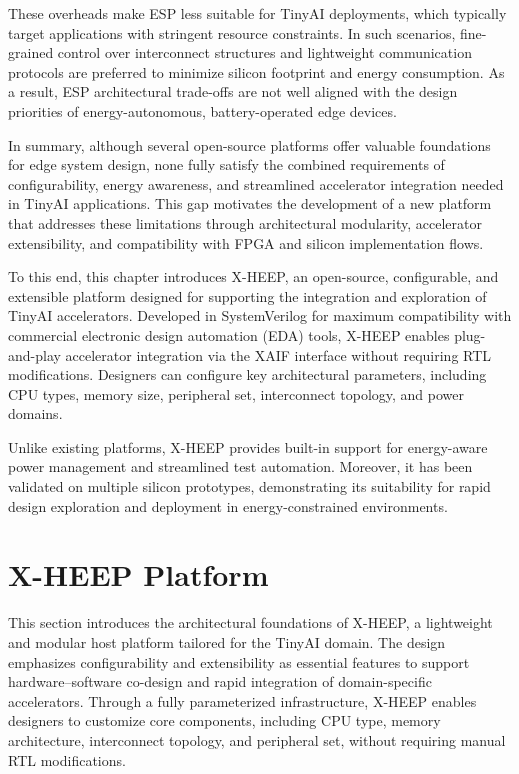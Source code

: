             These overheads make ESP less suitable for TinyAI deployments, which typically target applications with stringent resource constraints. In such scenarios, fine-grained control over interconnect structures and lightweight communication protocols are preferred to minimize silicon footprint and energy consumption. As a result, ESP architectural trade-offs are not well aligned with the design priorities of energy-autonomous, battery-operated edge devices.

            In summary, although several open-source platforms offer valuable foundations for edge system design, none fully satisfy the combined requirements of configurability, energy awareness, and streamlined accelerator integration needed in TinyAI applications. This gap motivates the development of a new platform that addresses these limitations through architectural modularity, accelerator extensibility, and compatibility with FPGA and silicon implementation flows.
            
            To this end, this chapter introduces \mbox{X-HEEP}, an open-source, configurable, and extensible platform designed for supporting the integration and exploration of TinyAI accelerators. Developed in SystemVerilog for maximum compatibility with commercial electronic design automation (EDA) tools, \mbox{X-HEEP} enables plug-and-play accelerator integration via the XAIF interface without requiring RTL modifications. Designers can configure key architectural parameters, including CPU types, memory size, peripheral set, interconnect topology, and power domains.
            
            Unlike existing platforms, \mbox{X-HEEP} provides built-in support for energy-aware power management and streamlined test automation. Moreover, it has been validated on multiple silicon prototypes, demonstrating its suitability for rapid design exploration and deployment in energy-constrained environments.\\

    \section{X-HEEP Platform}
    \label{sec:x-heep_platform}
    
        This section introduces the architectural foundations of \mbox{X-HEEP}, a lightweight and modular host platform tailored for the TinyAI domain. The design emphasizes configurability and extensibility as essential features to support hardware–software co-design and rapid integration of domain-specific accelerators. Through a fully parameterized infrastructure, \mbox{X-HEEP} enables designers to customize core components, including CPU type, memory architecture, interconnect topology, and peripheral set, without requiring manual RTL modifications.
        

